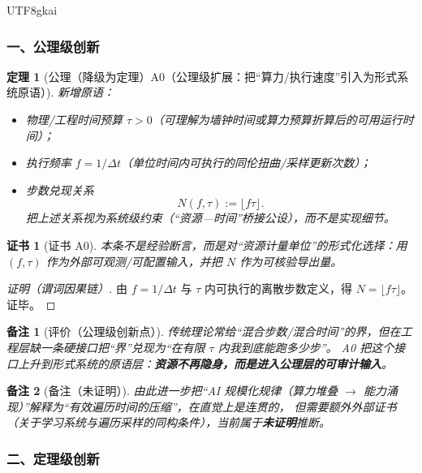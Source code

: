 \documentclass[12pt]{article}
\newtheorem{theorem}{定理}[section]
\newtheorem{remark}{备注}[section]
\newtheorem{Certificate}{证书}[section]
\begin{document}
\begin{CJK*}{UTF8}{gkai}
\subsubsection{一、公理级创新}
\label{subsubsec:tex27-ch23-axiom-level}

\begin{theorem}[公理（降级为定理）A0（公理级扩展：把“算力/执行速度”引入为形式系统原语）]
\label{thm:tex27-ch23-a0}
新增原语：
\begin{itemize}
  \item 物理/工程时间预算 $\tau>0$（可理解为墙钟时间或算力预算折算后的可用运行时间）；
  \item 执行频率 $f=1/\Delta t$（单位时间内可执行的同伦扭曲/采样更新次数）；
  \item 步数兑现关系
  \[
    N(f,\tau):=\lfloor f\tau\rfloor.
  \]
  把上述关系视为系统级约束（“资源—时间”桥接公设），而不是实现细节。
\end{itemize}
\end{theorem}

\begin{Certificate}[证书 A0]
\label{cert:tex27-ch23-a0}
本条不是经验断言，而是对“资源计量单位”的形式化选择：用 $(f,\tau)$ 作为外部可观测/可配置输入，并把 $N$ 作为可核验导出量。
\end{Certificate}

\begin{proof}[证明（谓词因果链）]
由 $f=1/\Delta t$ 与 $\tau$ 内可执行的离散步数定义，得 $N=\lfloor f\tau\rfloor$。证毕。
\end{proof}

\begin{remark}[评价（公理级创新点）]
\label{rem:tex27-ch23-a0-eval}
传统理论常给“混合步数/混合时间”的界，但在工程层缺一条硬接口把“界”兑现为“在有限 $\tau$ 内我到底能跑多少步”。
A0 把这个接口上升到形式系统的原语层：\textbf{资源不再隐身，而是进入公理层的可审计输入}。
\end{remark}

\begin{remark}[备注（未证明）]
\label{rem:tex27-ch23-a0-unproved}
由此进一步把“AI 规模化规律（算力堆叠 $\to$ 能力涌现）”解释为“有效遍历时间的压缩”，在直觉上是连贯的，
但需要额外外部证书（关于学习系统与遍历采样的同构条件），当前属于\textbf{未证明}推断。
\end{remark}

\subsubsection{二、定理级创新}
\label{subsubsec:tex27-ch23-theorem-level}


\end{CJK*}
\end{document}
